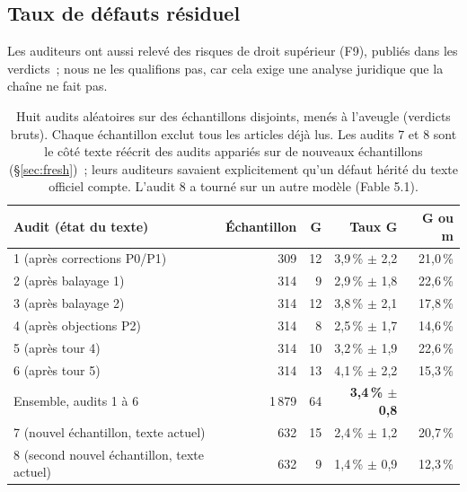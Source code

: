 \documentclass[11pt,a4paper]{article}
\begin{document}
\subsection{Taux de défauts résiduel}
Les auditeurs ont aussi relevé des risques de droit supérieur (F9), publiés dans les verdicts~; nous ne les qualifions pas, car cela exige une analyse juridique que la chaîne ne fait pas.

\begin{table}[ht]
\centering
\small
\begin{tabular}{lrrrr}
\toprule
Audit (état du texte) & Échantillon & G & Taux G & G ou m\\
\midrule
1 (après corrections P0/P1) & 309 & 12 & 3,9\,\% $\pm$ 2,2 & 21,0\,\%\\
2 (après balayage 1) & 314 & 9 & 2,9\,\% $\pm$ 1,8 & 22,6\,\%\\
3 (après balayage 2) & 314 & 12 & 3,8\,\% $\pm$ 2,1 & 17,8\,\%\\
4 (après objections P2) & 314 & 8 & 2,5\,\% $\pm$ 1,7 & 14,6\,\%\\
5 (après tour 4) & 314 & 10 & 3,2\,\% $\pm$ 1,9 & 22,6\,\%\\
6 (après tour 5) & 314 & 13 & 4,1\,\% $\pm$ 2,2 & 15,3\,\%\\
\midrule
Ensemble, audits 1 à 6 & 1\,879 & 64 & \textbf{3,4\,\% $\pm$ 0,8} & \\
\midrule
7 (nouvel échantillon, texte actuel) & 632 & 15 & 2,4\,\% $\pm$ 1,2 & 20,7\,\%\\
8 (second nouvel échantillon, texte actuel) & 632 & 9 & 1,4\,\% $\pm$ 0,9 & 12,3\,\%\\
\bottomrule
\end{tabular}
\caption{Huit audits aléatoires sur des échantillons disjoints, menés à l'aveugle (verdicts bruts). Chaque échantillon exclut tous les articles déjà lus. Les audits 7 et 8 sont le côté \og texte réécrit \fg{} des audits appariés sur de nouveaux échantillons (\S\ref{sec:fresh})~; leurs auditeurs savaient explicitement qu'un défaut hérité du texte officiel compte. L'audit 8 a tourné sur un autre modèle (Fable 5.1).}
\label{tab:audits}
\end{table}
\end{document}
